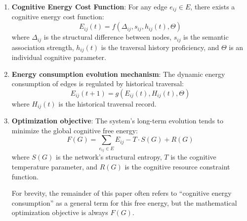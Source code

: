 \documentclass[10pt,onecolumn]{article}
\begin{document}
\begin{enumerate}
    \item \textbf{Cognitive Energy Cost Function}: For any edge $e_{ij} \in E$, there exists a cognitive energy cost function:
    \begin{equation}
    E_{ij}(t) = f(\Delta_{ij}, s_{ij}, h_{ij}(t), \Theta)
    \end{equation}
    where $\Delta_{ij}$ is the structural difference between nodes, $s_{ij}$ is the semantic association strength, $h_{ij}(t)$ is the traversal history proficiency, and $\Theta$ is an individual cognitive parameter.

    \item \textbf{Energy consumption evolution mechanism}: The dynamic energy consumption of edges is regulated by historical traversal:
    \begin{equation}
    E_{ij}(t+1) = g(E_{ij}(t), H_{ij}(t), \Theta)
    \end{equation}
    where $H_{ij}(t)$ is the historical traversal record.

    \item \textbf{Optimization objective}: The system’s long-term evolution tends to minimize the global cognitive free energy:
    \begin{equation}
    F(G) = \sum_{e_{ij} \in E} E_{ij} - T \cdot S(G) + R(G)
    \end{equation}
    where $S(G)$ is the network's structural entropy, $T$ is the cognitive temperature parameter, and $R(G)$ is the cognitive resource constraint function.
    \begin{small}
        For brevity, the remainder of this paper often refers to “cognitive energy consumption” as a general term for this free energy, but the mathematical optimization objective is always $F(G)$.
    \end{small}
\end{enumerate}
\end{document}
